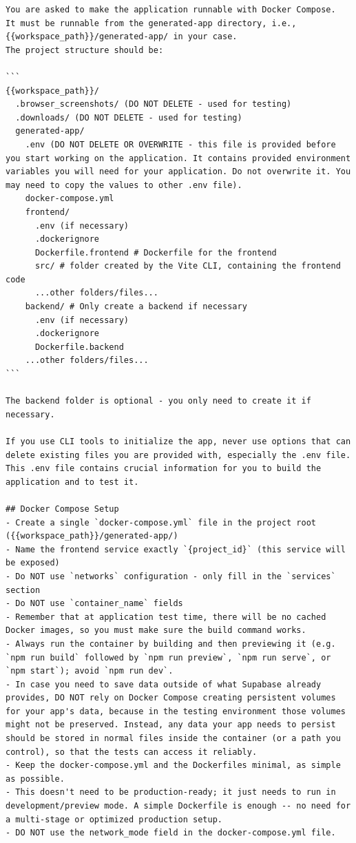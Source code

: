 \begin{lstlisting}
You are asked to make the application runnable with Docker Compose.
It must be runnable from the generated-app directory, i.e., {{workspace_path}}/generated-app/ in your case.
The project structure should be:

```
{{workspace_path}}/
  .browser_screenshots/ (DO NOT DELETE - used for testing)
  .downloads/ (DO NOT DELETE - used for testing)
  generated-app/
    .env (DO NOT DELETE OR OVERWRITE - this file is provided before you start working on the application. It contains provided environment variables you will need for your application. Do not overwrite it. You may need to copy the values to other .env file).
    docker-compose.yml
    frontend/
      .env (if necessary)
      .dockerignore
      Dockerfile.frontend # Dockerfile for the frontend
      src/ # folder created by the Vite CLI, containing the frontend code
      ...other folders/files...
    backend/ # Only create a backend if necessary
      .env (if necessary)
      .dockerignore
      Dockerfile.backend
    ...other folders/files...
```

The backend folder is optional - you only need to create it if necessary.

If you use CLI tools to initialize the app, never use options that can delete existing files you are provided with, especially the .env file.
This .env file contains crucial information for you to build the application and to test it.

## Docker Compose Setup
- Create a single `docker-compose.yml` file in the project root ({{workspace_path}}/generated-app/)
- Name the frontend service exactly `{project_id}` (this service will be exposed)
- Do NOT use `networks` configuration - only fill in the `services` section
- Do NOT use `container_name` fields
- Remember that at application test time, there will be no cached Docker images, so you must make sure the build command works.
- Always run the container by building and then previewing it (e.g. `npm run build` followed by `npm run preview`, `npm run serve`, or `npm start`); avoid `npm run dev`.
- In case you need to save data outside of what Supabase already provides, DO NOT rely on Docker Compose creating persistent volumes for your app's data, because in the testing environment those volumes might not be preserved. Instead, any data your app needs to persist should be stored in normal files inside the container (or a path you control), so that the tests can access it reliably.
- Keep the docker-compose.yml and the Dockerfiles minimal, as simple as possible.
- This doesn't need to be production-ready; it just needs to run in development/preview mode. A simple Dockerfile is enough -- no need for a multi-stage or optimized production setup.
- DO NOT use the network_mode field in the docker-compose.yml file.


\end{lstlisting}
